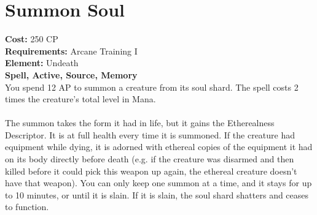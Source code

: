 \section{Summon Soul}
\textbf{Cost:} 250 CP\\
\textbf{Requirements:} Arcane Training I\\
\textbf{Element:} Undeath\\
\textbf{Spell, Active, Source, Memory}\\
You spend 12 AP to summon a creature from its soul shard. The spell costs 2 times the creature’s total level in Mana.\\
\\
The summon takes the form it had in life, but it gains the Etherealness Descriptor. It is at full health every time it is summoned. If the creature had equipment while dying, it is adorned with ethereal copies of the equipment it had on its body directly before death (e.g. if the creature was disarmed and then killed before it could pick this weapon up again, the ethereal creature doesn’t have that weapon). You can only keep one summon at a time, and it stays for up to 10 minutes, or until it is slain. If it is slain, the soul shard shatters and ceases to function.\\
